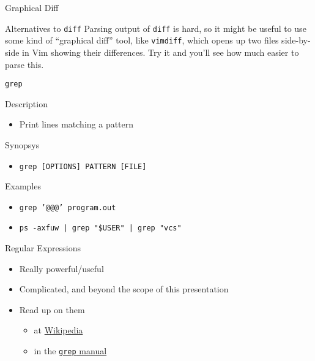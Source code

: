 \documentclass[table,dvipsnames]{beamer}
\begin{document}
\begin{frame}{Graphical Diff}
	\begin{block}{Alternatives to \texttt{diff}}
		Parsing output of \texttt{diff} is hard, so it might be useful to use 
		some kind of ``graphical diff'' tool, like \texttt{vimdiff}, which opens
		up two files side-by-side in Vim showing their differences. Try it and
		you'll see how much easier to parse this.
	\end{block}
\end{frame}

\begin{frame}{\texttt{grep}}
	\begin{block}{Description}
		\begin{itemize}
			\item Print lines matching a pattern
		\end{itemize}
	\end{block}
	\begin{block}{Synopsys}
		\begin{itemize}
			\item \texttt{grep [OPTIONS] PATTERN [FILE]}
		\end{itemize}
	\end{block}
	\begin{block}{Examples}
		\begin{itemize}
			\item \texttt{grep '@@@' program.out}
			\item \texttt{ps -axfuw | grep "\$USER" | grep "vcs"}
		\end{itemize}
	\end{block}
\end{frame}

\begin{frame}[fragile]{Regular Expressions}
	\begin{itemize}
		\item Really powerful/useful
		\item Complicated, and beyond the scope of this presentation
		\item Read up on them
			\begin{itemize}
				\item at
					\href{http://en.wikipedia.org/wiki/Regular_expressions}{Wikipedia}
				\item in the
					\href{http://www.gnu.org/software/grep/manual/grep.html#Regular-Expressions}{\texttt{grep} manual}
			\end{itemize}
	\end{itemize}
\end{frame}
\end{document}

